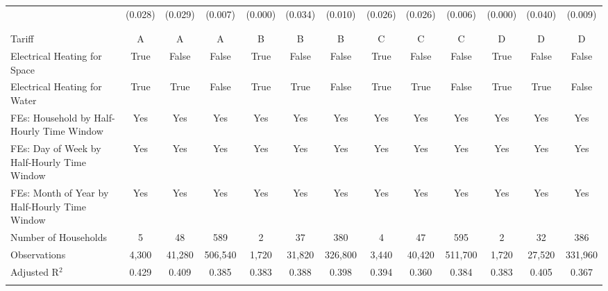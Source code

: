 \begin{table}[!htbp]
\begin{tabular}{@{\extracolsep{20pt}}lcccccccccccc}
  & (0.028) & (0.029) & (0.007) & (0.000) & (0.034) & (0.010) & (0.026) & (0.026) & (0.006) & (0.000) & (0.040) & (0.009) \\ 
  & & & & & & & & & & & & \\ 
\hline \\[-1.8ex] 
Tariff & A & A & A & B & B & B & C & C & C & D & D & D \\ 
Electrical Heating for Space & True & False & False & True & False & False & True & False & False & True & False & False \\ 
Electrical Heating for Water & True & True & False & True & True & False & True & True & False & True & True & False \\ 
FEs: Household by Half-Hourly Time Window & Yes & Yes & Yes & Yes & Yes & Yes & Yes & Yes & Yes & Yes & Yes & Yes \\ 
FEs: Day of Week by Half-Hourly Time Window & Yes & Yes & Yes & Yes & Yes & Yes & Yes & Yes & Yes & Yes & Yes & Yes \\ 
FEs: Month of Year by Half-Hourly Time Window & Yes & Yes & Yes & Yes & Yes & Yes & Yes & Yes & Yes & Yes & Yes & Yes \\ 
Number of Households &   5 &  48 & 589 &   2 &  37 & 380 &   4 &  47 & 595 &   2 &  32 & 386 \\ 
Observations & 4,300 & 41,280 & 506,540 & 1,720 & 31,820 & 326,800 & 3,440 & 40,420 & 511,700 & 1,720 & 27,520 & 331,960 \\ 
Adjusted R$^{2}$ & 0.429 & 0.409 & 0.385 & 0.383 & 0.388 & 0.398 & 0.394 & 0.360 & 0.384 & 0.383 & 0.405 & 0.367 \\ 
\hline 
\hline \\[-1.8ex] 
\end{tabular} 
\end{table} 
